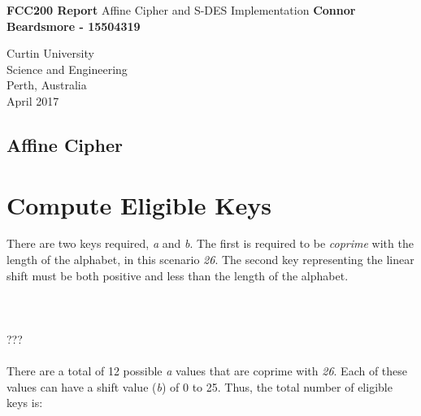 \documentclass[]{article}
\begin{document}

\begin{titlepage}
	\begin{center}
		\vspace*{1cm}
		\LARGE\textbf{FCC200 Report}
		\break
		Affine Cipher and S-DES Implementation
		\vspace{1cm}
		\break
		\Large\textbf{Connor Beardsmore - 15504319} 
		\vspace{15cm}

		\normalsize
		Curtin University \\
		Science and Engineering \\
		Perth, Australia \\
	    April 2017
	    
	\end{center}
\end{titlepage}


\vspace*{-0.8cm}
\begin{center}
	\section*{Affine Cipher}
\end{center}

\vspace*{0.8cm}
\section*{Compute Eligible Keys}

There are two keys required, \textit{a} and \textit{b}. The first is required to be \textit{coprime} with the length of the alphabet, in this scenario \textit{26}. The second key representing the linear shift must be both positive and less than the length of the alphabet.\\ \\ \\ \\

???\\\\

There are a total of 12 possible \textit{a} values that are coprime with \textit{26}. Each of these values can have a shift value (\textit{b}) of 0 to 25. Thus, the total number of eligible keys is:
\end{document}
